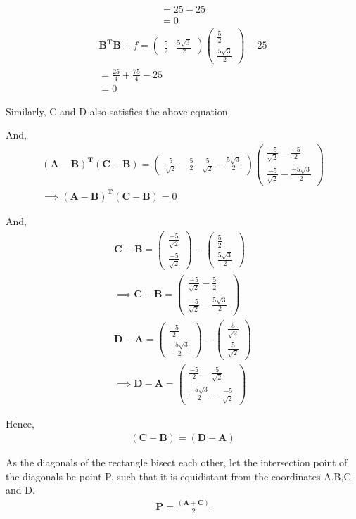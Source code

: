 \documentclass[a4,10pt]{report}
\newcommand{\myvec}[1]{\ensuremath{\begin{pmatrix}#1\end{pmatrix}}}
\let\vec\mathbf
\begin{document}
\begin{multicols}{2}
\begin{gather*}
		 = 25 -25 \\
	         = 0
	\end{gather*}
	\begin{gather*}
		\vec{B^T}\vec{B} + f = \myvec{\frac{5}{2} & \frac{5\sqrt{3}}{2}}\myvec{\frac{5}{2} \\ \frac{5\sqrt{3}}{2}} -25\\                                                                                                        = \frac{25}{4} + \frac{75}{4} -25 \\
		= 0
          \end{gather*}
	  \raggedright{Similarly, C and D also satisfies the above equation}\vspace{2mm}
	\raggedright{And,}
	\begin{gather}
		\vec{(A-B)^T}\vec{(C-B)} = \myvec{\frac{5}{\sqrt{2}}-\frac{5}{2} & \frac{5}{\sqrt{2}}-\frac{5\sqrt{3}}{2}}\myvec{\frac{-5}{\sqrt{2}}-\frac{-5}{2} \\ \frac{-5}{\sqrt{2}}-\frac{-5\sqrt{3}}{2}}\\
		\implies{\vec{(A-B)^T}\vec{(C-B)} = 0}
	\end{gather}
	\raggedright{And,}
	\begin{align*}
		\vec{C-B} = \myvec{\frac{-5}{\sqrt{2}} \\ \frac{-5}{\sqrt{2}}} - \myvec{\frac{5}{2} \\ \frac{5\sqrt{3}}{2}}\\
		\implies{\vec{C-B} = \myvec{\frac{-5}{\sqrt{2}}-\frac{5}{2} \\ \frac{-5}{\sqrt{2}}-\frac{5\sqrt{3}}{2}}}\\
		\vec{D-A} = \myvec{\frac{-5}{2} \\ \frac{-5\sqrt{3}}{2}} - \myvec{\frac{5}{\sqrt{2}} \\ \frac{5}{\sqrt{2}}}\\
		\implies{\vec{D-A} = \myvec{\frac{-5}{2}-\frac{5}{\sqrt{2}} \\ \frac{-5\sqrt{3}}{2}-\frac{-5}{\sqrt{2}}}}
	\end{align*}
	\raggedright{Hence,}
	\begin{gather}
		\vec{(C-B)} = \vec{(D-A)}
	\end{gather}
	\raggedright{As the diagonals of the rectangle bisect each other, let the intersection point of the diagonals be point P, such that it is equidistant from the coordinates A,B,C and D.}
	\begin{gather*}
		\vec{P} = \frac{\vec{(A+C)}}{2}\\

\end{gather*}
\end{multicols}
\end{document}

